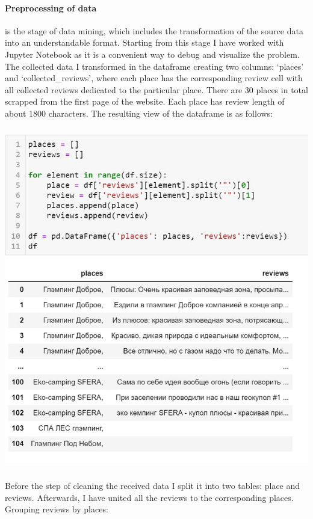 \documentclass{article}
\begin{document}
\paragraph{Preprocessing of data} is the stage of data mining, which includes the transformation of the source data into an understandable format. \newline
Starting from this stage I have worked with Jupyter Notebook\cite{bressert2012scipy}\cite{harrison2020pandas} as it is a convenient\cite{duchin2009markowitz} way to debug and visualize the problem. The collected data I transformed in the dataframe creating two columns: ‘places’ and ‘collected\_reviews’, where each place has the corresponding\cite{kravets2015creativity} review cell with all collected reviews dedicated to the particular place. There are 30 places in total scrapped from the first page of the website. Each place has review length of about 1800 characters. 
\newpage
The resulting view of the dataframe is as follows:
\newline
\begin{center}
\includegraphics[width=0.7\linewidth, left, height=15cm]{images/figure 5.jpg}
\end{center}
\newline
Before the step of cleaning the received data I split it into two tables: place and reviews. Afterwards, I have united all the reviews to the corresponding places.
\newline
Grouping reviews by places:
\end{document}
